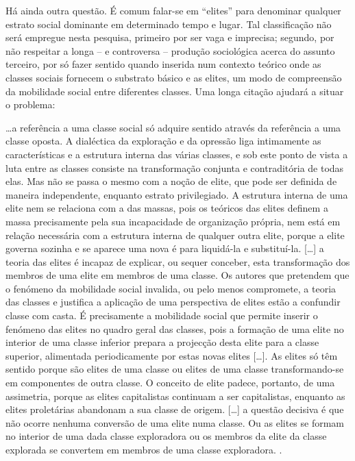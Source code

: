 Há ainda outra questão. É comum falar-se em ``elites'' para denominar qualquer estrato social dominante em determinado tempo e lugar. Tal classificação não será empregue nesta pesquisa, primeiro por ser vaga e imprecisa; segundo, por não respeitar a longa -- e controversa -- produção sociológica acerca do assunto \cite{bottomore_elites_1965,michels_partidos_1982,mosca_elementi_1923,pareto_mind_1935,
schumpeter_capitalismo_1961} terceiro, por só fazer sentido quando inserida num contexto teórico onde as classes sociais fornecem o substrato básico e as elites, um modo de compreensão da mobilidade social entre diferentes classes. Uma longa citação ajudará a situar o problema:

\begin{citacao}
\dots a referência a uma classe social só adquire sentido através da referência a uma classe oposta. A dialéctica da exploração e da opressão liga intimamente as características e a estrutura interna das várias classes, e sob este ponto de vista a luta entre as classes consiste na transformação conjunta e contraditória de todas elas. Mas não se passa o mesmo com a noção de elite, que pode ser definida de maneira independente, enquanto estrato privilegiado. A estrutura interna de uma elite nem se relaciona com a das massas, pois os teóricos das elites definem a massa precisamente pela sua incapacidade de organização própria, nem está em relação necessária com a estrutura interna de qualquer outra elite, porque a elite governa sozinha e se aparece uma nova é para liquidá-la e substituí-la. [\dots] a teoria das elites é incapaz de explicar, ou sequer conceber, esta transformação dos membros de uma elite em membros de uma classe. Os autores que pretendem que o fenómeno da mobilidade social invalida, ou pelo menos compromete, a teoria das classes e justifica a aplicação de uma perspectiva de elites estão a confundir classe com casta. É precisamente a mobilidade social que permite inserir o fenómeno das elites no quadro geral das classes, pois a formação de uma elite no interior de uma classe inferior prepara a projecção desta elite para a classe superior, alimentada periodicamente por estas novas elites [\dots]. As elites só têm sentido porque são elites de uma classe ou elites de uma classe transformando-se em componentes de outra classe. O conceito de elite padece, portanto, de uma assimetria, porque as elites capitalistas continuam a ser capitalistas, enquanto as elites proletárias abandonam a sua classe de origem. [\dots] a questão decisiva é que não ocorre nenhuma conversão de uma elite numa classe. Ou as elites se formam no interior de uma dada classe exploradora ou os membros da elite da classe explorada se convertem em membros de uma classe exploradora. \cite[p.~387-388]{bernardo_fascismo_2015}.
\end{citacao}

